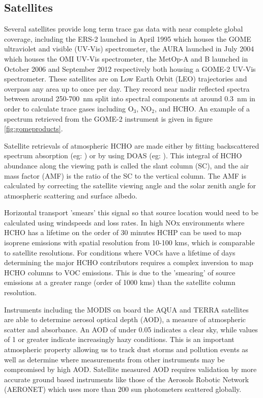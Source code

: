 \subsection{Satellites}

Several satellites provide long term trace gas data with near complete global coverage, including the ERS-2 launched in April 1995 which houses the GOME ultraviolet and visible (UV-Vis) spectrometer, the AURA launched in July 2004 which houses the OMI UV-Vis spectrometer, the MetOp-A and B launched in October 2006 and September 2012 respectively both housing a GOME-2 UV-Vis spectrometer.
These satellites are on Low Earth Orbit (LEO) trajectories and overpass any area up to once per day. 
They record near nadir reflected spectra between around 250-700~nm split into spectral components at around $0.3$~nm in order to calculate trace gases including O$_3$, NO$_2$, and HCHO.
An example of a spectrum retrieved from the GOME-2 instrument is given in figure \ref{fig:gomeproducts}.

Satellite retrievals of atmospheric HCHO are made either by fitting backscattered spectrum absorption (eg: \citet{Chance_2000}) or by using DOAS (eg: \cite{Leue_2001}).
This integral of HCHO abundance along the viewing path is called the slant column (SC), and the air mass factor (AMF) is the ratio of the SC to the vertical column.
The AMF is calculated by correcting the satellite viewing angle and the solar zenith angle for atmospheric scattering and surface albedo.

Horizontal transport 'smears' this signal so that source location would need to be calculated using windspeeds and loss rates.
In high NOx environments where HCHO has a lifetime on the order of 30 minutes HCHP can be used to map isoprene emissions with spatial resolution from 10-100 kms, which is comparable to satellite resolutions.
For conditions where VOCs have a lifetime of days determining the major HCHO contributors requires a complex inversion to map HCHO columns to VOC emissions.
This is due to the 'smearing' of source emissions at a greater range (order of 1000 kms) than the satellite column resolution.

Instruments including the MODIS on board the AQUA and TERRA satellites are able to determine aerosol optical depth (AOD), a measure of atmospheric scatter and absorbance. 
An AOD of under 0.05 indicates a clear sky, while values of 1 or greater indicate increasingly hazy conditions.
This is an important atmospheric property allowing us to track dust storms and pollution events as well as determine where measurements from other instruments may be compromised by high AOD.
Satellite measured AOD requires validation by more accurate ground based instruments like those of the Aerosols Robotic Network (AERONET) which uses more than 200 sun photometers scattered globally. 